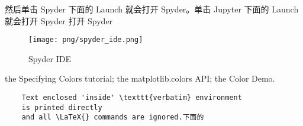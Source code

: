 \documentclass[main.tex]{subfiles}
\begin{document}
	然后单击 Spyder 下面的 Launch 就会打开 Spyder。单击 Jupyter 下面的 Launch 就会打开 Spyder
打开 Spyder
\begin{figure}[h]
	\centering
	\texttt{[image: png/spyder\_ide.png]}
	\caption{Spyder IDE}
	\label{fig:2.3.1}
\end{figure}


the Specifying Colors tutorial;
the matplotlib.colors API;
the Color Demo.
\begin{verbatim}
	Text enclosed 'inside' \texttt{verbatim} environment 
	is printed directly 
	and all \LaTeX{} commands are ignored.下面的 
\end{verbatim}


\end{document}
